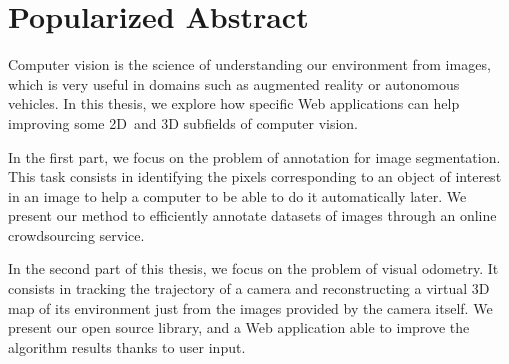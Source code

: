 \section*{Popularized Abstract}%
\label{sec:pop-abstract}

Computer vision is the science of understanding our environment from images,
which is very useful in domains such as augmented reality or autonomous vehicles.
In this thesis, we explore how specific Web applications can help improving
some 2D and 3D subfields of computer vision.

In the first part, we focus on the problem of annotation for image segmentation.
This task consists in identifying the pixels corresponding
to an object of interest in an image to help a computer to be able
to do it automatically later.
We present our method to efficiently annotate datasets of images
through an online crowdsourcing service.

In the second part of this thesis, we focus on the problem of visual odometry.
It consists in tracking the trajectory of a camera and reconstructing
a virtual 3D map of its environment just from the images provided by the camera itself.
We present our open source library, and a Web application able
to improve the algorithm results thanks to user input.
